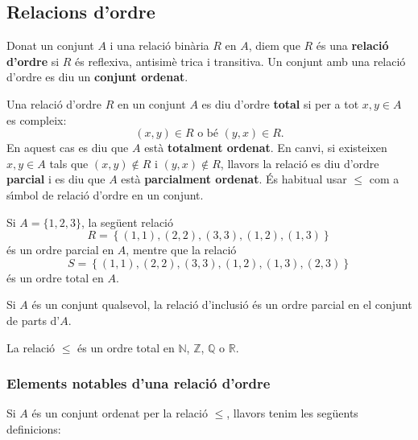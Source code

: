 \subsection{Relacions d'ordre}

Donat un conjunt $A$ i una relaci\'{o} bin\`{a}ria $R$ en $A$, diem que $R$
\'{e}s una \textbf{relaci\'{o} d'ordre} si $R$ \'{e}s reflexiva, antisim\`{e}%
trica i transitiva. Un conjunt amb una relaci\'{o} d'ordre es diu un \textbf{%
conjunt ordenat}.

Una relaci\'{o} d'ordre $R$ en un conjunt $A$ es diu d'ordre \textbf{total}
si per a tot $x,y\in A$ es compleix:%
\begin{equation*}
(x,y)\in R\text{ \ \ o b\'{e} \ \ }(y,x)\in R\text{.}
\end{equation*}
En aquest cas es diu que $A$ est\`{a} \textbf{totalment ordenat}. En canvi,
si existeixen $x,y\in A$ tals que $(x,y)\notin R$ i $(y,x)\notin R$, llavors
la relaci\'{o} es diu d'ordre \textbf{parcial} i es diu que $A$ est\`{a}
\textbf{parcialment ordenat}. \'{E}s habitual usar $\leq$ com a s\'{\i}mbol
de relaci\'{o} d'ordre en un conjunt.

\begin{exem}
Si $A=\{1,2,3\}$, la seg\"{u}ent relaci\'{o}%
\begin{equation*}
R=\left\{ (1,1),(2,2),(3,3),(1,2),(1,3)\right\}
\end{equation*}
\'{e}s un ordre parcial en $A$, mentre que la relaci\'{o}%
\begin{equation*}
S=\left\{ (1,1),(2,2),(3,3),(1,2),(1,3),(2,3)\right\}
\end{equation*}
\'{e}s un ordre total en $A$.
\end{exem}

\begin{exem}
Si $A$ \'{e}s un conjunt qualsevol, la relaci\'{o} d'inclusi\'{o} \'{e}s un
ordre parcial en el conjunt de parts d'$A$.
\end{exem}

\begin{exem}
La relaci\'{o} $\leq$ \'{e}s un ordre total en $\mathbb{N}$, $\mathbb{Z}$, $%
\mathbb{Q}$ o $\mathbb{R}$.
\end{exem}

\subsubsection{Elements notables d'una relaci\'{o} d'ordre}

Si $A$ \'{e}s un conjunt ordenat per la relaci\'{o} $\leq$, llavors tenim
les seg\"{u}ents definicions:

